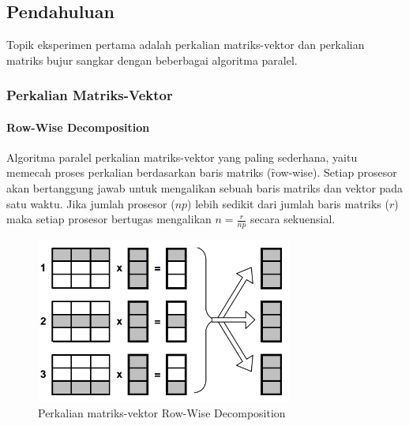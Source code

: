 \chapter{\topikSatu}

\section{Pendahuluan}
Topik eksperimen pertama adalah perkalian matriks-vektor dan perkalian matriks bujur sangkar dengan beberbagai algoritma paralel. 

\subsection{Perkalian Matriks-Vektor} 

\subsubsection{Row-Wise Decomposition}

Algoritma paralel perkalian matriks-vektor yang paling sederhana, yaitu memecah proses perkalian berdasarkan baris matriks (\f{row-wise}). Setiap prosesor akan bertanggung jawab untuk mengalikan sebuah baris matriks dan vektor pada satu waktu. Jika jumlah prosesor ($np$) lebih sedikit dari jumlah baris matriks ($r$) maka setiap prosesor bertugas mengalikan $n = \frac{r}{np}$ secara sekuensial.

\begin{figure}
	\centering
	\includegraphics[width=0.75\textwidth]
	{pics/mv_rowwise}
	\caption{Perkalian matriks-vektor Row-Wise Decomposition}
	\label{fig:mv_rowwise}
\end{figure}  

